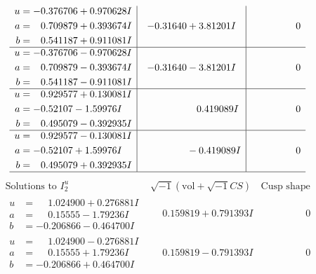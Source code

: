 \documentclass[1p]{elsarticle_modified}
\theoremstyle{definition}
\newcommand{\I}{\sqrt{-1}}
\begin{document}
$$\begin{array}{c|c|c}
\begin{aligned}
u &= -0.376706 + 0.970628 I \\
a &= \phantom{-}0.709879 + 0.393674 I \\
b &= \phantom{-}0.541187 + 0.911081 I\end{aligned}
 & -0.31640 + 3.81201 I & \phantom{-0.000000 } 0 \\ \hline\begin{aligned}
u &= -0.376706 - 0.970628 I \\
a &= \phantom{-}0.709879 - 0.393674 I \\
b &= \phantom{-}0.541187 - 0.911081 I\end{aligned}
 & -0.31640 - 3.81201 I & \phantom{-0.000000 } 0 \\ \hline\begin{aligned}
u &= \phantom{-}0.929577 + 0.130081 I \\
a &= -0.52107 - 1.59976 I \\
b &= \phantom{-}0.495079 - 0.392935 I\end{aligned}
 & \phantom{-0.000000 -}0.419089 I & \phantom{-0.000000 } 0 \\ \hline\begin{aligned}
u &= \phantom{-}0.929577 - 0.130081 I \\
a &= -0.52107 + 1.59976 I \\
b &= \phantom{-}0.495079 + 0.392935 I\end{aligned}
 & \phantom{-0.000000 } -0.419089 I & \phantom{-0.000000 } 0\\
 \hline 
 \end{array}$$\newpage$$\begin{array}{c|c|c}  
\text{Solutions to }I^u_{2}& \I (\text{vol} + \sqrt{-1}CS) & \text{Cusp shape}\\
 \hline 
\begin{aligned}
u &= \phantom{-}1.024900 + 0.276881 I \\
a &= \phantom{-}0.15555 - 1.79236 I \\
b &= -0.206866 - 0.464700 I\end{aligned}
 & \phantom{-}0.159819 + 0.791393 I & \phantom{-0.000000 } 0 \\ \hline\begin{aligned}
u &= \phantom{-}1.024900 - 0.276881 I \\
a &= \phantom{-}0.15555 + 1.79236 I \\
b &= -0.206866 + 0.464700 I\end{aligned}
 & \phantom{-}0.159819 - 0.791393 I & \phantom{-0.000000 } 0 \\ \hline\begin{aligned}

\end{aligned}
\end{array}$$
\end{document}

